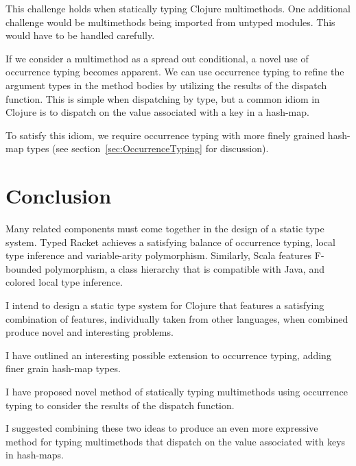 \documentclass[12pt, a4paper]{article}
\begin{document}
This challenge holds when statically typing Clojure multimethods.
One additional challenge would be multimethods being imported from 
untyped modules. This would have to be handled carefully.

If we consider a multimethod as a spread out conditional, a
novel use of occurrence typing becomes apparent. We can use
occurrence typing to refine the argument types in the method bodies
by utilizing the results of the dispatch function. This is simple
when dispatching by type, but a common idiom in Clojure is to dispatch
on the value associated with a key in a hash-map. 

To satisfy this idiom, we require occurrence typing with more
finely grained hash-map types (see section~\ref{sec:OccurrenceTyping} for discussion).

\section{Conclusion}

Many related components must come together in the design of a
static type system. Typed Racket achieves a satisfying balance of 
occurrence typing, local type inference and variable-arity polymorphism.
Similarly, Scala features F-bounded polymorphism, a class hierarchy
that is compatible with Java, and colored local type inference.

I intend to design a static type system for Clojure
that features a satisfying combination of features, individually taken from other
languages, when combined produce novel and interesting problems.

I have outlined an interesting possible extension to occurrence typing,
adding finer grain hash-map types. 

I have proposed novel method of statically typing multimethods
using occurrence typing to consider the results of the dispatch function.

I suggested combining these two ideas to produce an even more expressive
method for typing multimethods that dispatch on the value associated with keys in hash-maps.

\printbibliography
\end{document}
